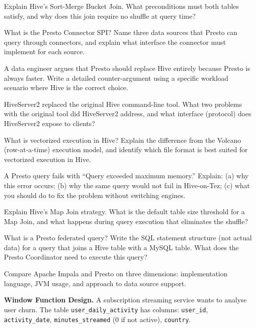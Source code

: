 \sq Explain Hive's Sort-Merge Bucket Join. What preconditions must
both tables satisfy, and why does this join require no shuffle at query
time?

\sq What is the Presto Connector SPI? Name three data sources that
Presto can query through connectors, and explain what interface the
connector must implement for each source.

\sq A data engineer argues that Presto should replace Hive entirely
because Presto is always faster. Write a detailed counter-argument
using a specific workload scenario where Hive is the correct choice.

\sq HiveServer2 replaced the original Hive command-line tool. What
two problems with the original tool did HiveServer2 address, and what
interface (protocol) does HiveServer2 expose to clients?

\sq What is vectorized execution in Hive? Explain the difference from
the Volcano (row-at-a-time) execution model, and identify which file
format is best suited for vectorized execution in Hive.

\sq A Presto query fails with ``Query exceeded maximum memory.''
Explain: (a) why this error occurs; (b) why the same query would
not fail in Hive-on-Tez; (c) what you should do to fix the problem
without switching engines.

\sq Explain Hive's Map Join strategy. What is the default table size
threshold for a Map Join, and what happens during query execution
that eliminates the shuffle?

\sq What is a Presto federated query? Write the SQL statement structure
(not actual data) for a query that joins a Hive table with a MySQL table.
What does the Presto Coordinator need to execute this query?

\sq Compare Apache Impala and Presto on three dimensions: implementation
language, JVM usage, and approach to data source support.

\bigskip
{}

\ap \textbf{Window Function Design.}
A subscription streaming service wants to analyse user churn. The table
\texttt{user\_daily\_activity} has columns: \texttt{user\_id},
\texttt{activity\_date}, \texttt{minutes\_streamed} (0 if not active),
\texttt{country}.

